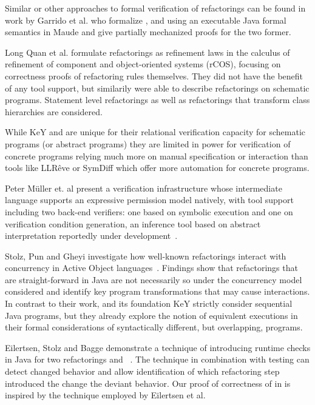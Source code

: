 Similar or other approaches to formal verification of refactorings can be found in work by
Garrido et al. \cite{garrido2006formal} who formalize ,
 and  using an executable
Java formal semantics in Maude and give partially mechanized proofs for the two former.

Long Quan et al. \cite{DBLP:conf/isola/QuanQL08} formulate refactorings as refinement
laws in the calculus of refinement of component and object-oriented systems (rCOS),
focusing on correctness proofs of refactoring rules themselves.
They did not have the benefit of any tool support, but similarily were able to describe
refactorings on schematic programs.
Statement level refactorings as well as refactorings that transform class hierarchies are considered.

While KeY and \Refinity{} are unique for their relational verification capacity for
schematic programs (or abstract programs) they are limited in power for verification
of concrete programs relying much more on manual specification or interaction \cite{DBLP:conf/aplas/Steinhofel20}
than tools like LLRêve \cite{DBLP:journals/jar/KieferKU18} or SymDiff \cite{DBLP:conf/cav/LahiriHKR12}
which offer more automation for concrete programs.

Peter M{\"u}ller et. al present a verification infrastructure whose intermediate language supports
an expressive permission model natively, with tool support including two back-end verifiers: one based on
symbolic execution and one on verification condition generation, an inference tool based on abstract
interpretation reportedly under development~\cite{DBLP:series/natosec/0001SS17}.

Stolz, Pun and Gheyi investigate how well-known refactorings interact with concurrency in Active Object languages~\cite{DBLP:conf/isola/StolzPG20}.
Findings show that refactorings that are straight-forward in Java are not necessarily so under the concurrency model considered and identify key
program transformations that may cause interactions.
In contrast to their work, \Refinity{} and its foundation KeY strictly consider sequential Java programs,
but they already explore the notion of equivalent executions in their formal considerations of syntactically different, but overlapping, programs.

Eilertsen, Stolz and Bagge demonstrate a technique of introducing runtime checks in Java for two refactorings  and
~\cite{stolz:isolarefa}. The technique in combination with testing can detect changed behavior and allow identification
of which refactoring step introduced the change the deviant behavior.
Our proof of correctness of  in \Refinity{} is inspired by the technique employed by Eilertsen et al.


